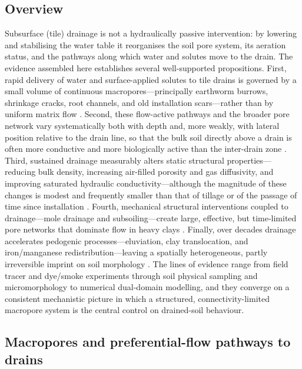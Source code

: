 \subsection{Overview}

Subsurface (tile) drainage is not a hydraulically passive intervention: by lowering
and stabilising the water table it reorganises the soil pore system, its aeration
status, and the pathways along which water and solutes move to the drain. The
evidence assembled here establishes several well-supported propositions. First,
rapid delivery of water and surface-applied solutes to tile drains is governed by a
small volume of continuous macropores---principally earthworm burrows, shrinkage
cracks, root channels, and old installation scars---rather than by uniform matrix
flow \parencite{Shipitalo2004,Stamm2002,Villholth1998,Zehe2001,Nielsen2015,Petersen2012}.
Second, these flow-active pathways and the broader pore network vary systematically
both with depth and, more weakly, with lateral position relative to the drain line,
so that the bulk soil directly above a drain is often more conductive and more
biologically active than the inter-drain zone \parencite{Shipitalo2004,Alakukku2010,Nielsen2015,Petersen2012,Montagne2009}.
Third, sustained drainage measurably alters static structural properties---reducing
bulk density, increasing air-filled porosity and gas diffusivity, and improving
saturated hydraulic conductivity---although the magnitude of these changes is modest
and frequently smaller than that of tillage or of the passage of time since
installation \parencite{HUNDAL1976,Nakajima2014,LAL1993,Frankl2023,Caron2025}.
Fourth, mechanical structural interventions coupled to drainage---mole drainage and
subsoiling---create large, effective, but time-limited pore networks that dominate
flow in heavy clays \parencite{MULLER1988,HARRIS1993,PLAMENAC1988,JHA1995,Castanheira2010}.
Finally, over decades drainage accelerates pedogenic processes---eluviation, clay
translocation, and iron/manganese redistribution---leaving a spatially heterogeneous,
partly irreversible imprint on soil morphology \parencite{Montagne2008,Montagne2010,Montagne2013,Mercier2000,YliHalla2009}.
The lines of evidence range from field tracer and dye/smoke experiments through soil
physical sampling and micromorphology to numerical dual-domain modelling, and they
converge on a consistent mechanistic picture in which a structured, connectivity-limited
macropore system is the central control on drained-soil behaviour.

\subsection{Macropores and preferential-flow pathways to drains}

